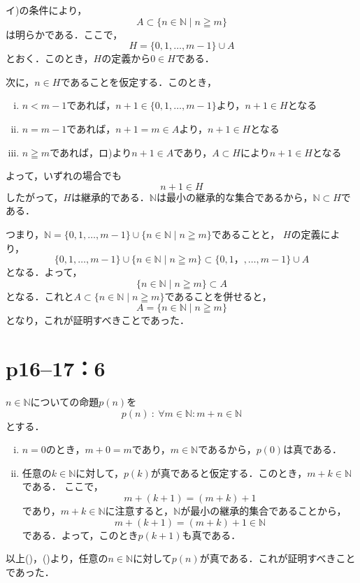 \begin{tproof}
    イ)の条件により，
    \[
        A \subset \{n \in \mathbb{N} \mid n \geqq m\}
    \]
    は明らかである．ここで，
    \[
        H=\{0,1,\dots,m-1\} \cup A
    \]
    とおく．このとき，$H$の定義から$0 \in H$である．

    次に，$n \in H$であることを仮定する．このとき，
    \begin{enumerate}[(i)]
        \item  $n<m-1$であれば，$n+1 \in \{0,1,\dots,m-1\}$より，$n+1 \in H$となる
        \item $n=m-1$であれば，$n+1=m \in A$より，$n+1 \in H$となる
        \item $n \geqq m$であれば，ロ)より$n+1 \in A$であり，$A \subset H $により$n + 1\in H$となる
    \end{enumerate}
    よって，いずれの場合でも
    \[
        n+1 \in H
    \]
    したがって，$H$は継承的である．$\mathbb{N}$は最小の継承的な集合であるから，$\mathbb{N} \subset H$である．

    つまり，$\mathbb{N} =  \{0,1,\dots,m-1\} \cup \{n \in \mathbb{N} \mid n \geqq m \}$であることと，
    $H$の定義により，
    \[
        \{0,1,\dots,m-1\} \cup \{n \in \mathbb{N} \mid n \geqq m \} \subset \{0,1，,\dots,m-1\} \cup A
    \]
    となる．よって，
    \[
        \{n \in \mathbb{N}\mid n \geqq m \} \subset A
    \]
    となる．これと$ A \subset \{n \in \mathbb{N} \mid n \geqq m\}$であることを併せると，
    \[
        A=\{n \in \mathbb{N} \mid n \geqq m \}
    \]
    となり，これが証明すべきことであった．
\end{tproof}

\newpage

\section*{p16--17：6}


\begin{tproof}
    $n \in \mathbb{N}$についての命題$p(n)$を
    \[
        p(n) ~{:}~ \forall m \in \mathbb{N} \colon  m+n \in \mathbb{N}
    \]
    とする．
    \begin{enumerate}[(i)]
        \item $n=0$のとき，$m+0=m$であり，$m \in \mathbb{N}$であるから，$p(0)$は真である．
        \item 任意の$k \in \mathbb{N}$に対して，$p(k)$が真であると仮定する．このとき，$m+k \in \mathbb{N}$である．
              ここで，
              \[
                  m+(k+1)=(m+k)+1
              \] であり，$m+k \in \mathbb{N}$に注意すると，$\mathbb{N}$が最小の継承的集合であることから，
              \[
                  m+(k+1)=(m+k)+1  \in \mathbb{N}
              \]
              である．よって，このとき$p(k+1)$も真である．
    \end{enumerate}
    以上()，()より，任意の$n \in \mathbb{N}$に対して$p(n)$が真である．これが証明すべきことであった．
\end{tproof}


